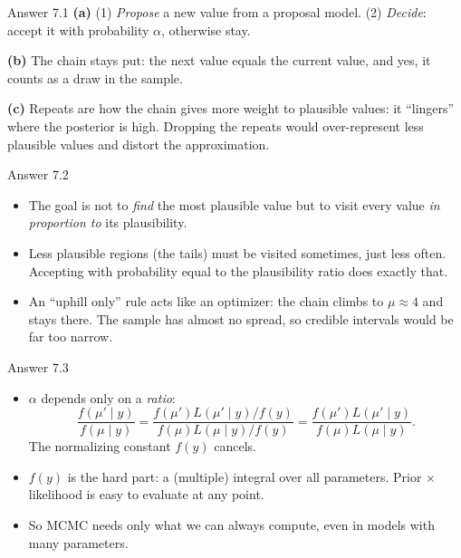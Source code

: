 \documentclass[aspectratio=43,11pt]{beamer}
\begin{document}
\begin{frame}{Answer 7.1}
  \textbf{(a)} (1) \emph{Propose} a new value from a proposal model.
  (2) \emph{Decide}: accept it with probability $\alpha$, otherwise stay.
  \vspace{0.4em}

  \textbf{(b)} The chain stays put: the next value equals the current
  value, and yes, it counts as a draw in the sample.
  \vspace{0.4em}

  \textbf{(c)} Repeats are how the chain gives more weight to plausible
  values: it ``lingers'' where the posterior is high. Dropping the
  repeats would over-represent less plausible values and distort the
  approximation.
\end{frame}

\begin{frame}{Answer 7.2}
  \begin{itemize}
    \item The goal is not to \emph{find} the most plausible value but to
      visit every value \emph{in proportion to} its plausibility.
    \item Less plausible regions (the tails) must be visited sometimes,
      just less often. Accepting with probability equal to the
      plausibility ratio does exactly that.
    \item An ``uphill only'' rule acts like an optimizer: the chain climbs
      to $\mu \approx 4$ and stays there. The sample has almost no spread,
      so credible intervals would be far too narrow.
  \end{itemize}
\end{frame}

\begin{frame}{Answer 7.3}
  \begin{itemize}
    \item $\alpha$ depends only on a \emph{ratio}:
    \[
      \frac{f(\mu' \mid y)}{f(\mu \mid y)}
      = \frac{f(\mu')L(\mu' \mid y)/f(y)}{f(\mu)L(\mu \mid y)/f(y)}
      = \frac{f(\mu')L(\mu' \mid y)}{f(\mu)L(\mu \mid y)}.
    \]
      The normalizing constant $f(y)$ cancels.
    \item $f(y)$ is the hard part: a (multiple) integral over all
      parameters. Prior $\times$ likelihood is easy to evaluate at any
      point.
    \item So MCMC needs only what we can always compute, even in models
      with many parameters.
  \end{itemize}
\end{frame}
\end{document}
